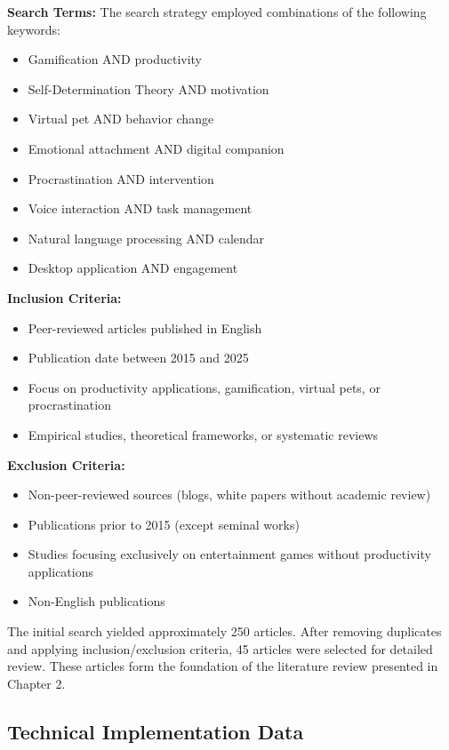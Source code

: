 \textbf{Search Terms:} The search strategy employed combinations of the following keywords:
\begin{itemize}
    \item Gamification AND productivity
    \item Self-Determination Theory AND motivation
    \item Virtual pet AND behavior change
    \item Emotional attachment AND digital companion
    \item Procrastination AND intervention
    \item Voice interaction AND task management
    \item Natural language processing AND calendar
    \item Desktop application AND engagement
\end{itemize}

\textbf{Inclusion Criteria:}
\begin{itemize}
    \item Peer-reviewed articles published in English
    \item Publication date between 2015 and 2025
    \item Focus on productivity applications, gamification, virtual pets, or procrastination
    \item Empirical studies, theoretical frameworks, or systematic reviews
\end{itemize}

\textbf{Exclusion Criteria:}
\begin{itemize}
    \item Non-peer-reviewed sources (blogs, white papers without academic review)
    \item Publications prior to 2015 (except seminal works)
    \item Studies focusing exclusively on entertainment games without productivity applications
    \item Non-English publications
\end{itemize}

The initial search yielded approximately 250 articles. After removing duplicates and applying inclusion/exclusion criteria, 45 articles were selected for detailed review. These articles form the foundation of the literature review presented in Chapter 2.

\subsection{Technical Implementation Data}


